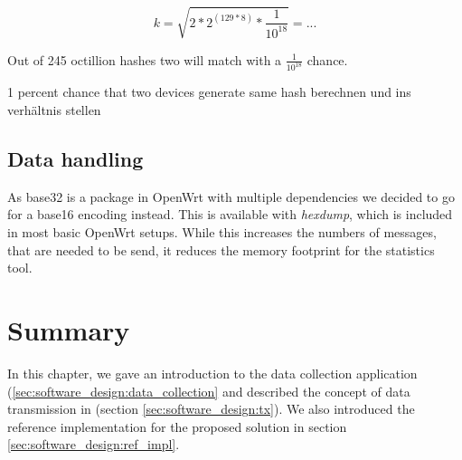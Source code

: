      \begin{equation}
         \label{eq:129B_solve}
         k = \sqrt{2 * 2^{(129 * 8)} * \frac{1}{10^{18}}} = ...
     \end{equation}
     
     Out of 245 octillion hashes two will match with a $\frac{1}{10^18}$ chance. 
     
     1 percent chance that two devices generate same hash
     berechnen und ins verhältnis stellen
     
     
% 
\subsection{Data handling}
    As base32 is a package in OpenWrt with multiple dependencies we decided to go for a base16 encoding instead. This is available with \textit{hexdump}, which is included in most basic OpenWrt setups. While this increases the numbers of messages, that are needed to be send, it reduces the memory footprint for the statistics tool.
\section{Summary}

In this chapter, we gave an introduction to the data collection application (\ref{sec:software_design:data_collection} and described the concept of data transmission in (section \ref{sec:software_design:tx}).
We also introduced the reference implementation for the proposed solution in section \ref{sec:software_design:ref_impl}. 
%